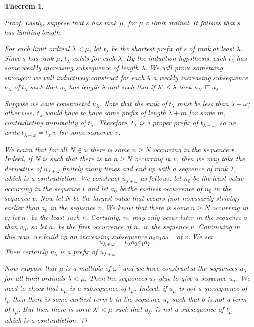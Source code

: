 \documentclass[11pt]{article} %
\theoremstyle{plain} %
\newtheorem{theorem}{Theorem}[section]
\theoremstyle{definition} %
\theoremstyle{note}
\theoremstyle{exercisestyle}
\newcommand{\prefix}{\sqsubseteq}
\begin{document}
\begin{theorem}
\begin{proof}
    Lastly, suppose that $s$ has rank $\mu$, for $\mu$ a limit ordinal.  It follows that $s$ has limiting length.  

    For each limit ordinal $\lambda<\mu$, let $t_\lambda$ be the shortest prefix of $s$ of rank at least $\lambda$.  Since $s$ has rank $\mu$, $t_\lambda$ exists for each $\lambda$.  By the induction hypothesis, each $t_\lambda$ has some weakly increasing subsequence of length $\lambda$.  We will prove something stronger: we will inductively construct for each $\lambda$ a weakly increasing subsequence $u_\lambda$ of $t_\lambda$ such that $u_\lambda$ has length $\lambda$ and such that if $\lambda'\le\lambda$ then $u_{\lambda'}\prefix u_\lambda$.  

    Suppose we have constructed $u_\lambda$.  Note that the rank of $t_\lambda$ must be less than $\lambda+\omega$; otherwise, $t_\lambda$ would have to have some prefix of length $\lambda+m$ for some $m$, contradicting minimality of $t_\lambda$.  Therefore, $t_\lambda$ is a proper prefix of $t_{\lambda+\omega}$, so we write $t_{\lambda+\omega}=t_\lambda.v$ for some sequence $v$.  

    We claim that for all $N\in\omega$ there is some $n\ge N$ occurring in the sequence $v$.  Indeed, if $N$ is such that there is no $n\ge N$ occurring in $v$, then we may take the derivative of $u_{\lambda+\omega}$ finitely many times and end up with a sequence of rank $\lambda$, which is a contradiction.  We construct $u_{\lambda+\omega}$ as follows: let $n_0$ be the least value occurring in the sequence $v$ and let $a_0$ be the earliest occurrence of $n_0$ in the sequence $v$.  Now let $N$ be the largest value that occurs (not necessarily strictly) earlier than $a_0$ in the sequence $v$.  We know that there is some $n\ge N$ occurring in $v$; let $n_1$ be the least such $n$.  Certainly, $n_1$ may only occur later in the sequence $v$ than $a_0$, so let $a_1$ be the first occurrence of $n_1$ in the sequence $v$.  Continuing in this way, we build up an increasing subsequence $a_0 a_1 a_2 \dots$ of $v$.  We set
    \[
      u_{\lambda+\omega} = u_\lambda a_0 a_1 a_2 \dots
      \]
    Then certainly $u_\lambda$ is a prefix of $u_{\lambda+\omega}$.  

    Now suppose that $\mu$ is a multiple of $\omega^2$ and we have constructed the sequences $u_\lambda$ for all limit ordinals $\lambda<\mu$.  Then the sequences $u_\lambda$ glue to give a sequence $u_\mu$.  We need to check that $u_\mu$ is a subsequence of $t_\mu$.  Indeed, if $u_\mu$ is not a subsequence of $t_\mu$ then there is some earliest term $b$ in the sequence $u_\mu$ such that $b$ is not a term of $t_\mu$.  But then there is some $\lambda'<\mu$ such that $u_{\lambda'}$ is not a subsequence of $t_\mu$, which is a contradiction.  


\end{proof}
\end{theorem}
\end{document}
